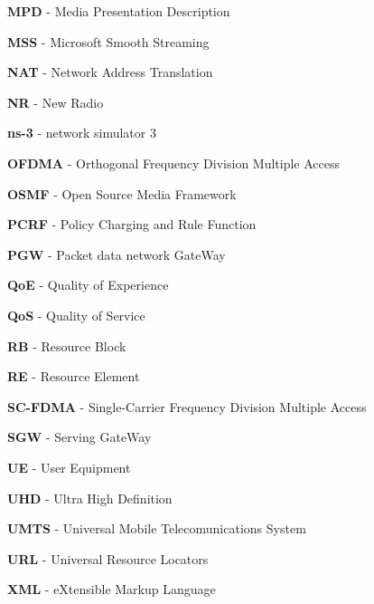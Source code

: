 \textbf{MPD} - Media Presentation Description

\textbf{MSS} - Microsoft Smooth Streaming

\textbf{NAT} - Network Address Translation

\textbf{NR} - New Radio

\textbf{ns-3} - network simulator 3

\textbf{OFDMA} - Orthogonal Frequency Division Multiple Access

\textbf{OSMF} - Open Source Media Framework

\textbf{PCRF} - Policy Charging and Rule Function

\textbf{PGW} - Packet data network GateWay

\textbf{QoE} - Quality of Experience

\textbf{QoS} - Quality of Service

\textbf{RB} - Resource Block

\textbf{RE} - Resource Element

\textbf{SC-FDMA} - Single-Carrier Frequency Division Multiple Access

\textbf{SGW} - Serving GateWay

\textbf{UE} - User Equipment

\textbf{UHD} - Ultra High Definition

\textbf{UMTS} - Universal Mobile Telecomunications System

\textbf{URL} - Universal Resource Locators

\textbf{XML} - eXtensible Markup Language


\cleardoublepage
